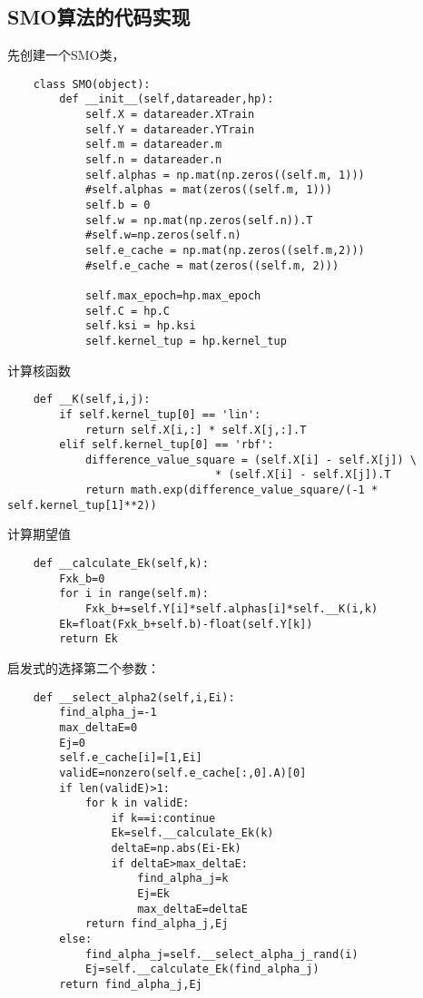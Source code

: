 \documentclass[UTF8]{ctexart}
\begin{document}
\subsection{SMO算法的代码实现}

先创建一个SMO类，
\begin{verbatim}
    class SMO(object):
        def __init__(self,datareader,hp):
            self.X = datareader.XTrain
            self.Y = datareader.YTrain
            self.m = datareader.m
            self.n = datareader.n
            self.alphas = np.mat(np.zeros((self.m, 1)))
            #self.alphas = mat(zeros((self.m, 1)))
            self.b = 0
            self.w = np.mat(np.zeros(self.n)).T
            #self.w=np.zeros(self.n)
            self.e_cache = np.mat(np.zeros((self.m,2)))
            #self.e_cache = mat(zeros((self.m, 2)))

            self.max_epoch=hp.max_epoch
            self.C = hp.C
            self.ksi = hp.ksi
            self.kernel_tup = hp.kernel_tup
\end{verbatim}

计算核函数
\begin{verbatim}
    def __K(self,i,j):
        if self.kernel_tup[0] == 'lin':
            return self.X[i,:] * self.X[j,:].T
        elif self.kernel_tup[0] == 'rbf':
            difference_value_square = (self.X[i] - self.X[j]) \
                                * (self.X[i] - self.X[j]).T
            return math.exp(difference_value_square/(-1 * self.kernel_tup[1]**2))
\end{verbatim}

计算期望值
\begin{verbatim}
    def __calculate_Ek(self,k):
        Fxk_b=0
        for i in range(self.m):
            Fxk_b+=self.Y[i]*self.alphas[i]*self.__K(i,k)
        Ek=float(Fxk_b+self.b)-float(self.Y[k])
        return Ek
\end{verbatim}


启发式的选择第二个参数：
\begin{verbatim}
    def __select_alpha2(self,i,Ei):
        find_alpha_j=-1
        max_deltaE=0
        Ej=0
        self.e_cache[i]=[1,Ei]
        validE=nonzero(self.e_cache[:,0].A)[0]
        if len(validE)>1:
            for k in validE:
                if k==i:continue
                Ek=self.__calculate_Ek(k)
                deltaE=np.abs(Ei-Ek)
                if deltaE>max_deltaE:
                    find_alpha_j=k
                    Ej=Ek
                    max_deltaE=deltaE
            return find_alpha_j,Ej
        else:
            find_alpha_j=self.__select_alpha_j_rand(i)
            Ej=self.__calculate_Ek(find_alpha_j)
        return find_alpha_j,Ej
\end{verbatim}
\end{document}
